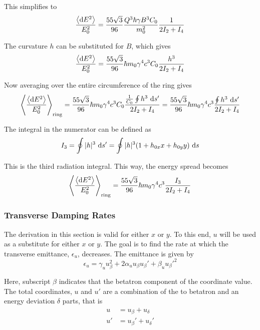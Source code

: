 This simplifies to
\begin{equation}
    \frac{\left\langle {\text{d}E^2} \right\rangle}{E_0^2} = \frac{55 \sqrt{3}}{96} \frac{Q^3 \hbar \gamma B^3 C_0}{m_0^2} \frac{1}{2I_2 + I_4}
\end{equation}

The curvature $h$ can be substituted for $B$, which gives
\begin{equation}
    \frac{\left\langle {\text{d}E^2} \right\rangle}{E_0^2} = \frac{55 \sqrt{3}}{96} \hbar m_0 \gamma^4 c^3 C_0 \frac{h^3}{2I_2 + I_4}
    \label{eq:meanenergydeviation}
\end{equation}

Now averaging over the entire circumference of the ring gives
\begin{equation}
    \left\langle {\frac{\left\langle {\text{d}E^2} \right\rangle}{E_0^2}} \right\rangle_\text{ring} = \frac{55 \sqrt{3}}{96} \hbar m_0 \gamma^4 c^3 C_0 \frac{\frac{1}{C_0}\oint h^3 \ \text{d} s'}{2I_2 + I_4} = \frac{55 \sqrt{3}}{96} \hbar m_0 \gamma^4 c^3 \frac{\oint h^3 \ \text{d} s'}{2I_2 + I_4}
\end{equation}

The integral in the numerator can be defined as
\begin{equation}
    I_3 = \oint |h|^3 \ \text{d} s' = \oint |h|^3 (1 + h_{0x} x + h_{0y}y) \ \text{d} s
\end{equation}

This is the third radiation integral. This way, the energy spread becomes
\begin{equation}
    \left\langle {\frac{\left\langle {\text{d}E^2} \right\rangle}{E_0^2}} \right\rangle_\text{ring} = \frac{55 \sqrt{3}}{96} \hbar m_0 \gamma^4 c^3 \frac{I_3}{2I_2 + I_4}
\end{equation}

\subsubsection{Transverse Damping Rates}
\label{sec:transversedamping}

The derivation in this section is valid for either $x$ or $y$. To this end, $u$ will be used as a substitute for either $x$ or $y$. The goal is to find the rate at which the transverse emittance, $\epsilon_u$, decreases. The emittance is given by
\begin{equation}
    \epsilon_u = \gamma_u u_\beta^2 + 2 \alpha_u u_\beta u_\beta' + \beta_u u_\beta'^2
    \label{eq:emittanceu}
\end{equation}

Here, subscript $\beta$ indicates that the betatron component of the coordinate value. The total coordinates, $u$ and $u'$ are a combination of the to betatron and an energy deviation $\delta$ parts, that is
\begin{align}
    u  &= u_\beta  + u_\delta\\
    u' &= u_\beta' + u_\delta'
\end{align}

